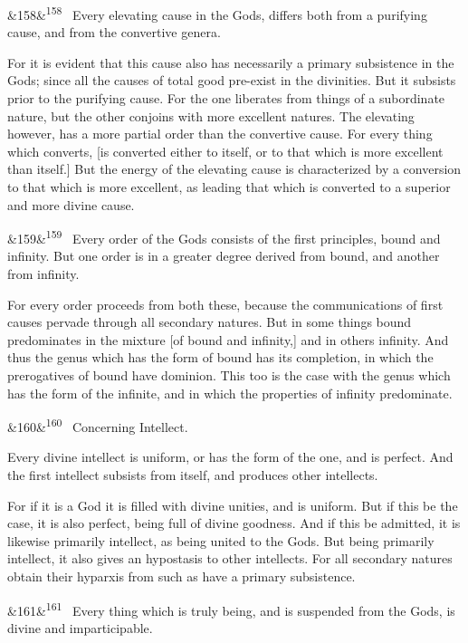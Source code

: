 \documentclass[12pt]{article}
\newcommand{\para}[1][]{\par\noindent\ifx&#1&\else\textsuperscript{\footnotesize #1}~\fi}
\begin{document}
\para[158] Every elevating cause in the Gods, differs both from a purifying cause, and from the convertive genera.

For it is evident that this cause also has necessarily a primary subsistence in the Gods; since all the causes of total good pre-exist in the divinities. But it subsists prior to the purifying cause. For the one liberates from things of a subordinate nature, but the other conjoins with more excellent natures. The elevating however, has a more partial order than the convertive cause. For every thing which converts, [is converted either to itself, or to that which is more excellent than itself.] But the energy of the elevating cause is characterized by a conversion to that which is more excellent, as leading that which is converted to a superior and more divine cause.

\para[159] Every order of the Gods consists of the first principles, bound and infinity. But one order is in a greater degree derived from bound, and another from infinity.

For every order proceeds from both these, because the communications of first causes pervade through all secondary natures. But in some things bound predominates in the mixture [of bound and infinity,] and in others infinity. And thus the genus which has the form of bound has its completion, in which the prerogatives of bound have dominion. This too is the case with the genus which has the form of the infinite, and in which the properties of infinity predominate.

\para[160] Concerning Intellect.

Every divine intellect is uniform, or has the form of the one, and is perfect. And the first intellect subsists from itself, and produces other intellects.

For if it is a God it is filled with divine unities, and is uniform. But if this be the case, it is also perfect, being full of divine goodness. And if this be admitted, it is likewise primarily intellect, as being united to the Gods. But being primarily intellect, it also gives an hypostasis to other intellects. For all secondary natures obtain their hyparxis from such as have a primary subsistence.

\para[161] Every thing which is truly being, and is suspended from the Gods, is divine and imparticipable.
\end{document}
